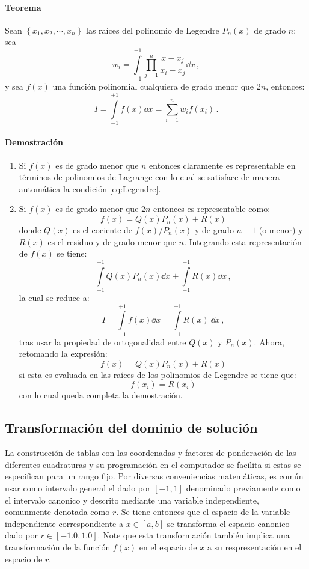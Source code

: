 \paragraph*{Teorema}
Sean $\left\{ x_1, x_2,\cdots, x_n \right\}$ las raíces del polinomio de 
Legendre $P_n(x)$ de grado $n$; sea
\[w_i = \int\limits_{-1}^{+1} \prod\limits_{j=1}^n \frac{x - x_j}{x_i - x_j} 
\dd{x}\, , \]
y sea $f(x)$ una función polinomial cualquiera de grado menor que $2n$, entonces:
\begin{equation}
  I = \int\limits_{-1}^{+1} f(x)\dd{x}  = \sum\limits_{i=1}^n w_i f(x_i)\, .
  \label{eq:Legendre}
\end{equation}


\paragraph*{Demostración}

\begin{enumerate}
\item Si $f(x)$ es de grado menor que $n$ entonces claramente es representable 
en términos de polinomios de Lagrange con lo cual se satisface de manera 
automática la condición \cref{eq:Legendre}.

\item Si $f(x)$ es de grado menor que $2n$ entonces es representable como:
\[f(x) = Q(x){P_n}(x) + R(x)\]
donde $Q(x)$ es el cociente de $f(x)/{P_n}(x)$ y de grado $n-1$ (o menor) y $R(x)$ es el residuo y de grado menor que $n$. Integrando esta representación de $f(x)$ se tiene:
\[\int\limits_{-1}^{+1} Q(x) P_n(x) \dd{x}  + \int\limits_{-1}^{+1} R(x) \dd{x}\, , \]
la cual se reduce a:
\[I = \int\limits_{ -1}^{ +1} f(x) \dd{x}  = \int\limits_{ -1}^{ +1} R(x)\ \dd{x}\, , \]
tras usar la propiedad de ortogonalidad entre $Q(x)$ y $P_n (x)$. Ahora, retomando la expresión:
\[f(x) = Q(x){P_n}(x) + R(x)\]
si esta es evaluada en las raíces de los polinomios de Legendre se tiene que:
\[f(x_i) = R(x_i)\]
con lo cual queda completa la demostración.

\end{enumerate}

\subsection{Transformación del dominio de solución}\label{sec:isopar}
La construcción de tablas con las coordenadas y factores de ponderación de las diferentes cuadraturas y su programación en el computador se facilita si estas se especifican para un rango fijo. Por diversas conveniencias matemáticas, es común usar como 
intervalo general el dado por $[-1, 1]$ denominado previamente como el intervalo canonico y descrito mediante una variable independiente, comunmente denotada como $r$. Se tiene entonces que el espacio de la variable independiente correspondiente a $x \in [a , b]$ se transforma el espacio canonico dado por $r \in [-1.0 , 1.0]$. Note que esta transformación también implica una transformación de la función $f(x)$ en el espacio de $x$ a su respresentación en el espacio de $r$.

